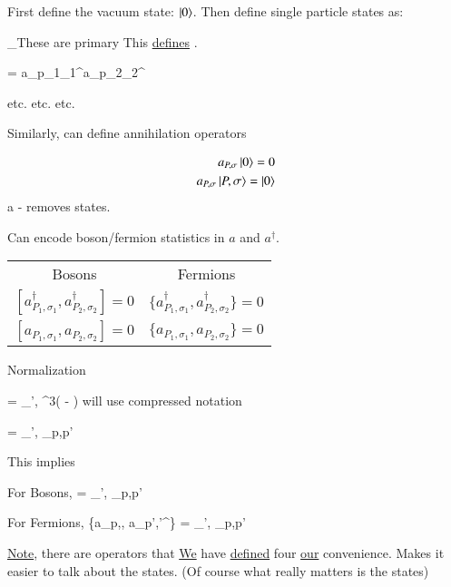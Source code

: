 {First define the vacuum state: $\ket{0}$.
Then define single particle states as:

\be
{}_{\textrm{These are primary}} \equiv \adagger {}
\ee
This \underline{defines} \adagger.



\be
{} = a_{p_1\sigma_1}^\dagger a_{p_2\sigma_2}^\dagger {}
\ee

etc. etc. etc.


Similarly,  can define annihilation operators


\begin{align*}
a_{P,\sigma} \ket{0} = 0\\
a_{P,\sigma} \ket{P,\sigma} = \ket{0}
\end{align*}
a - removes states. 


Can encode boson/fermion statistics in $a$ and $a^\dagger$.

\begin{center}
\begin{tabular}{c|c}
Bosons & Fermions \\
$[a_{P_1,\sigma_1}^\dagger, a_{P_2,\sigma_2}^\dagger] = 0 $  &  $\{a_{P_1,\sigma_1}^\dagger, a_{P_2,\sigma_2}^\dagger\} = 0 $\\  
$[a_{P_1,\sigma_1}, a_{P_2,\sigma_2}] = 0  $  &  $\{a_{P_1,\sigma_1}, a_{P_2,\sigma_2}\} = 0  $\\  
\end{tabular}
\end{center}


Normalization

\be
{} = \delta_{\sigma',\sigma} \delta^3( - )
\ee 
will use compressed notation

\be
{} = \delta_{\sigma',\sigma} \delta_{p,p'}
\ee 

This implies

For Bosons,
 = \delta_{\sigma',\sigma} \delta_{p,p'}
\ee


For Fermions,
\be
\{a_{p,\sigma}, a_{p',\sigma'}^\dagger\} = \delta_{\sigma',\sigma} \delta_{p,p'}
\ee

\underline{Note}, there are operators that \underline{We} have \underline{defined} four \underline{our} convenience.
Makes it easier to talk about the states.  (Of course what really matters is the states)

\clearpage

}
